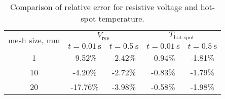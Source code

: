  \begin{table}[H]
    \caption{Comparison of relative error for resistive voltage and hot-spot temperature.} 
    \vspace{-1.em} 
    \fontsize{10}{10}
    \selectfont 
    \renewcommand{\arraystretch}{1.5}
    \begin{center}
        \begin{tabular}{ c | cc | cc }  
        \hline
        \multirow{2}{*}{mesh size, mm} & \multicolumn{2}{c|}{$V_\text{res}$} & \multicolumn{2}{c}{$T_\text{hot-spot}$} \\ 
           & $t=0.01~\text{s}$ & $t=0.5~\text{s}$ & $t=0.01~\text{s}$ & $t=0.5~\text{s}$ \\
        \hline
        1 & -9.52\% & -2.42\% & -0.94\% & -1.81\% \\
        10 & -4.20\% & -2.72\% & -0.83\% & -1.79\% \\
        20 & -17.76\% & -3.98\% & -0.58\% & -1.98\% \\
        \hline 
        \end{tabular}
    \end{center}  
     \label{table: 1d_qv_benchmarking_with_insulation_res_and_hot_spot_error_conclusion} 
 \end{table}